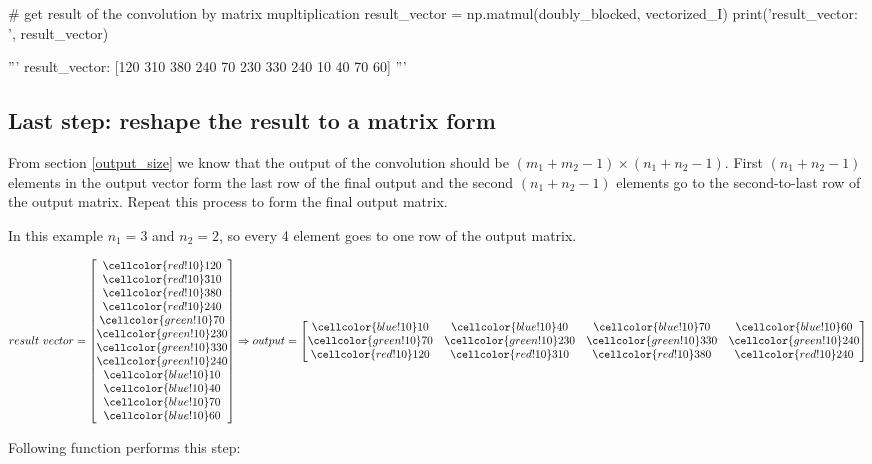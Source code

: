 \documentclass[11pt]{article}
\newcommand\x{\cellcolor{red!10}}
\newcommand\y{\cellcolor{green!10}}
\newcommand\z{\cellcolor{blue!10}}
\begin{document}
	\vspace{10mm}
	\begin{python}
 # get result of the convolution by matrix mupltiplication
 result_vector = np.matmul(doubly_blocked, vectorized_I)
 print('result_vector: ', result_vector)

 '''
 result_vector: [120 310 380 240 70 230 330 240 10 40 70 60]
 '''
	\end{python}
	\vspace{10mm}
	
	\subsection{Last step: reshape the result to a matrix form}
	From section \ref{output_size} we know that the output of the convolution should be $(m_1 + m_2 -1) \times (n_1 + n_2 -1)$. First $(n_1 + n_2 -1)$ elements in the output vector form the last row of the final output and the second $(n_1 + n_2 -1)$ elements go to the second-to-last row of the output matrix. Repeat this process to form the final output matrix.
	
	In this example $n_1 = 3$ and $n_2 = 2$, so every 4 element goes to one row of the output matrix.
	
	\begin{equation}
	result \ vector = 
	\begin{bmatrix}
	\x 120\\ \x  310\\ \x 380\\ \x 240\\ \y 70\\ \y 230\\ \y 330\\ \y 240\\ \z 10\\ \z 40\\ \z 70\\ \z 60\\
	\end{bmatrix}
	\Rightarrow output= 
	\begin{bmatrix}
	\z 10 & \z 40 & \z 70 & \z 60\\
	\y 70 & \y 230 & \y 330 & \y 240\\
	\x 120 & \x  310 & \x 380 & \x 240\\
	\end{bmatrix}
	\end{equation}
	\vspace{10mm}
	
	Following function performs this step:
	
\end{document}
